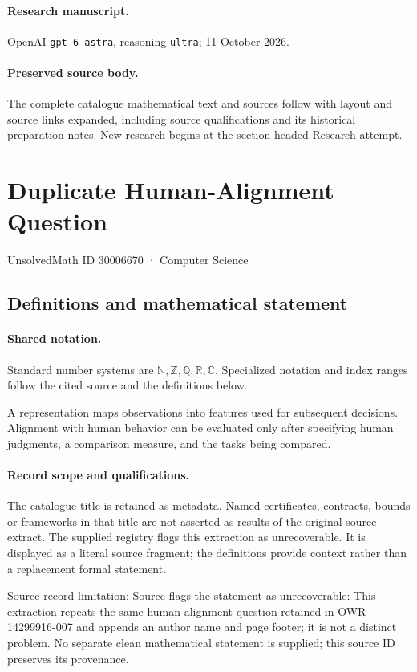 \documentclass[11pt]{article}
\begin{document}
\paragraph{Research manuscript.} OpenAI \texttt{gpt-6-astra}, reasoning \texttt{ultra}; 11 October 2026.
\paragraph{Preserved source body.} The complete catalogue mathematical text and sources follow with layout and source links expanded, including source qualifications and its historical preparation notes. New research begins at the section headed Research attempt.

\section{Duplicate Human-Alignment Question}\label{30006670}
{\small UnsolvedMath ID 30006670 · Computer Science}
\subsection{Definitions and mathematical statement}

\paragraph{Shared notation.}Standard number systems are $\mathbb N,\mathbb Z,\mathbb Q,\mathbb R,\mathbb C$. Specialized notation and index ranges follow the cited source and the definitions below.


A representation maps observations into features used for subsequent decisions. Alignment with human behavior can be evaluated only after specifying human judgments, a comparison measure, and the tasks being compared.
\paragraph{Record scope and qualifications.}
The catalogue title is retained as metadata. Named certificates, contracts, bounds or frameworks in that title are not asserted as results of the original source extract.
The supplied registry flags this extraction as unrecoverable. It is displayed as a literal source fragment; the definitions provide context rather than a replacement formal statement.

Source-record limitation: Source flags the statement as unrecoverable: This extraction repeats the same human-alignment question retained in OWR-14299916-007 and appends an author name and page footer; it is not a distinct problem. No separate clean mathematical statement is supplied; this source ID preserves its provenance.
\end{document}
